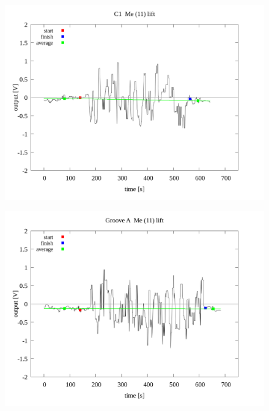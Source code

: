 \documentclass[a4paper]{jsarticle}
\begin{document}
\begin{figure}[htbp]
    \footnotesize
    \begin{center}
        \includegraphics[width=140mm]{../../../../33_result/210806/median/11/lift/03/C1_me(11)_lift_03.png}
    \end{center}
\end{figure}

\begin{figure}[htbp]
    \footnotesize
    \begin{center}
        \includegraphics[width=140mm]{../../../../33_result/210806/median/11/lift/03/Groove_A_me(11)_lift_03.png}
    \end{center}
\end{figure}
\end{document}
